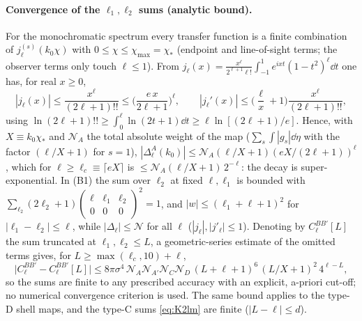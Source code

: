 \paragraph{Convergence of the $\ell_1,\ell_2$ sums (analytic bound).}  For the monochromatic spectrum every transfer function is a finite
combination of $j^{(s)}_\ell(k_0\chi)$ with $0\le\chi\le\chi_{\max}=\chi_*$ (endpoint and line-of-sight terms; the observer terms only touch
$\ell\le1$).  From $j_\ell(x)=\frac{x^\ell}{2^{\ell+1}\ell!}\int_{-1}^1e^{ixt}(1-t^2)^\ell\dd t$ one has, for real $x\ge0$,
\begin{equation}
|j_\ell(x)|\le\frac{x^\ell}{(2\ell+1)!!}\le\Big(\frac{e\,x}{2\ell+1}\Big)^\ell,\qquad
|j_\ell'(x)|\le\Big(\frac{\ell}{x}+1\Big)\frac{x^\ell}{(2\ell+1)!!},
\label{eq:jbound}
\end{equation}
using $\ln(2\ell+1)!!\ge\int_0^\ell\ln(2t+1)\dd t\ge\ell\ln[(2\ell+1)/e]$.  Hence, with $X\equiv k_0\chi_*$ and $\mathcal N_A$ the total absolute weight of the
map ($\sum_s\int|g_s|\dd\eta$ with the factor $(\ell/X+1)$ for $s=1$), $|\Delta^A_\ell(k_0)|\le\mathcal N_A(\ell/X+1)(eX/(2\ell+1))^\ell$, which for
$\ell\ge\ell_c\equiv\lceil eX\rceil$ is $\le\mathcal N_A(\ell/X+1)\,2^{-\ell}$: the decay is super-exponential.  In (B1) the sum over $\ell_2$ at
fixed $\ell,\ell_1$ is bounded with $\sum_{\ell_2}(2\ell_2+1)(\begin{smallmatrix}\ell&\ell_1&\ell_2\\0&0&0\end{smallmatrix})^2=1$, and $|w|\le(\ell_1+\ell+1)^2$
for $|\ell_1-\ell_2|\le\ell$, while $|\Delta_\ell|\le\mathcal N$ for all $\ell$ ($|j_\ell|,|j'_\ell|\le1$).  Denoting by $C^{BB'}_\ell[L]$ the sum truncated at
$\ell_1,\ell_2\le L$, a geometric-series estimate of the omitted terms gives, for $L\ge\max(\ell_c,10)+\ell$,
\begin{equation}
\big|C^{BB'}_\ell-C^{BB'}_\ell[L]\big|\le8\pi\sigma^4\,\mathcal N_A\mathcal N_{A'}\mathcal N_C\mathcal N_D\,(L+\ell+1)^{6}\,(L/X+1)^2\,4^{\ell-L},
\label{eq:tailbound}
\end{equation}
so the sums are finite to any prescribed accuracy with an explicit, a-priori cut-off; no numerical convergence criterion is used.  The
same bound applies to the type-D shell maps, and the type-C sums \eqref{eq:K2lm} are finite ($|L-\ell|\le d$).

